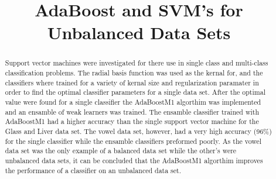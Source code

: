 \documentclass[conference]{IEEEtran}
\begin{document}
\title{AdaBoost and SVM's for Unbalanced Data Sets}

\author{
}

\maketitle

\begin{abstract}
Support vector machines were investigated for there use in single class and multi-class classification problems.
The radial basis function was used as the kernal for, and the classifiers where trained for a variety of kernal size and regularization paramater in order to find the optimal classifier parameters for a single data set.
After the optimal value were found for a single classifier the AdaBoostM1 algorthim was implemented and an ensamble of weak learners was trained.
The ensamble classifier trained with AdaBoostM1 had a higher accuracy than the single support vector machine for the Glass and Liver data set.
The vowel data set, however, had a very high accuracy (96\%) for the single classifier while the ensamble classifiers preformed poorly.
As the vowel data set was the only example of a balanced data set while the other's were unbalanced data sets, it can be concluded that the AdaBoostM1 algorthim improves the performance of a classifier on an unbalanced data set.
\end{abstract}

\IEEEpeerreviewmaketitle








\end{document}
